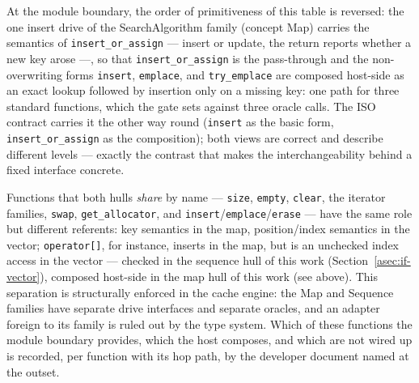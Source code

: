 \noindent At the module boundary, the order of primitiveness of this table is reversed: the one
insert drive of the SearchAlgorithm family (concept Map) carries the semantics of
\texttt{insert\_or\_assign} --- insert or
update, the return reports whether a new key arose ---, so that \texttt{insert\_or\_assign} is the
pass-through and the non-overwriting forms \texttt{insert}, \texttt{emplace}, and
\texttt{try\_emplace} are composed host-side as an exact lookup followed by insertion only on a
missing key: one path for three standard functions, which the gate sets against three oracle calls.
The ISO contract carries it the other way round (\texttt{insert} as the basic form,
\texttt{insert\_or\_assign} as the composition); both views are correct and describe different
levels --- exactly the contrast that makes the interchangeability behind a fixed interface
concrete.

\noindent Functions that both hulls \emph{share} by name --- \texttt{size}, \texttt{empty},
\texttt{clear}, the iterator families, \texttt{swap}, \texttt{get\_allocator}, and
\texttt{insert}/\texttt{emplace}/\texttt{erase} --- have the same role but different referents: key
semantics in the map, position/index semantics in the vector; \texttt{operator[]}, for instance,
inserts in the map, but is an unchecked index access in the vector --- checked in the sequence
hull of this work (Section~\ref{asec:if-vector}), composed host-side in the map hull of this work
(see above). This separation is structurally enforced in the cache engine: the Map and Sequence
families have separate drive interfaces and separate oracles, and an adapter foreign to its family is
ruled out by the type system. Which of these functions the module boundary provides, which the host
composes, and which are not wired up is recorded, per function with its hop path, by the developer
document named at the outset.
